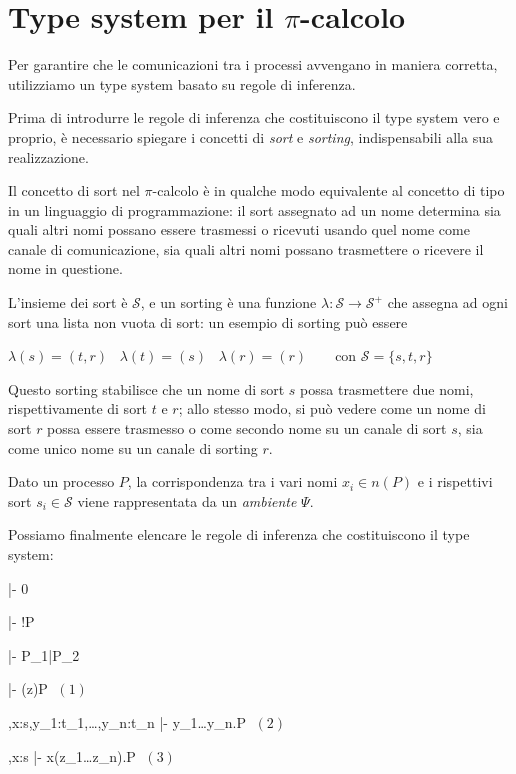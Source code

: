 \section{Type system per il \texorpdfstring{$\pi$}{pi}-calcolo}

Per garantire che le comunicazioni tra i processi avvengano in maniera
corretta, utilizziamo un type system basato su regole di
inferenza\cite{qw05}.

Prima di introdurre le regole di inferenza che costituiscono il type system
vero e proprio, \`e necessario spiegare i concetti di \emph{sort} e
\emph{sorting}, indispensabili alla sua realizzazione.

Il concetto di sort nel $\pi$-calcolo \`e in qualche modo equivalente al
concetto di tipo in un linguaggio di programmazione: il sort assegnato ad un
nome determina sia quali altri nomi possano essere trasmessi o ricevuti usando
quel nome come canale di comunicazione, sia quali altri nomi possano
trasmettere o ricevere il nome in questione.

L'insieme dei sort \`e $\mathcal{S}$, e un sorting \`e una funzione
$\lambda : \mathcal{S} \rightarrow \mathcal{S}^{+}$ che assegna ad ogni sort
una lista non vuota di sort: un esempio di sorting pu\`o essere

\begin{pilisting}
$
    \lambda(s) = (t,r) \;\;\;
    \lambda(t) = (s)   \;\;\;
    \lambda(r) = (r)   \;\;\;\;\;\;
$
con $\mathcal{S} = \{s,t,r\}$
\end{pilisting}

Questo sorting stabilisce che un nome di sort $s$ possa trasmettere due
nomi, rispettivamente di sort $t$ e $r$; allo stesso modo, si pu\`o vedere
come un nome di sort $r$ possa essere trasmesso o come secondo nome su un
canale di sort $s$, sia come unico nome su un canale di sorting $r$.

Dato un processo $P$, la corrispondenza tra i vari nomi $x_i \in n(P)$ e
i rispettivi sort $s_i \in \mathcal{S}$ viene rappresentata da un
\emph{ambiente} $\Psi$.

Possiamo finalmente elencare le regole di inferenza che costituiscono il
type system:

\begin{pilisting}
\inference[nil ]
  {}
  {\Psi |- 0}

\vspace{3mm}
\indent
{}
  {\Psi |- !P}

\vspace{3mm}
\indent
{}
  {\Psi |- P_1|P_2}

\vspace{3mm}
\indent
{}
  {\Psi |- (z)P}
$\; (1)$

\vspace{3mm}
\indent
{}
  {\Psi,x:s,y_1:t_1,\ldots,y_n:t_n |- \langle y_1\ldots y_n\rangle.P}
$\; (2)$

\vspace{3mm}
\indent
{}
  {\Psi,x:s |- x(z_1\ldots z_n).P}
$\; (3)$
\end{pilisting}

